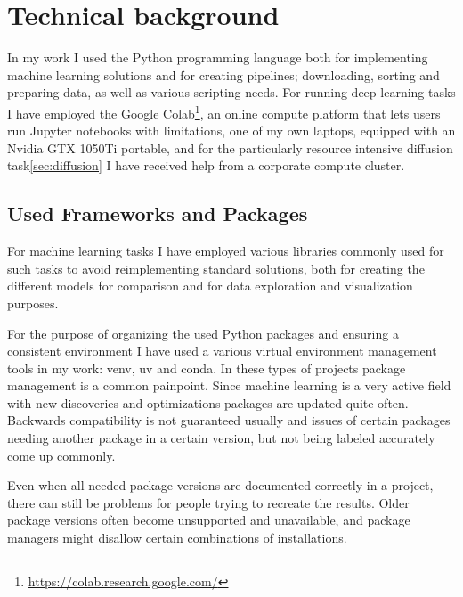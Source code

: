 \chapter{Technical background}

	In my work I used the Python programming language both for implementing machine learning solutions and for creating pipelines; downloading, sorting and preparing data, as well as various scripting needs. For running deep learning tasks I have employed the Google Colab\footnote{\url{https://colab.research.google.com/}}, an online compute platform that lets users run Jupyter notebooks with limitations, one of my own laptops, equipped with an Nvidia GTX 1050Ti portable, and for the particularly resource intensive diffusion task\ref{sec:diffusion} I have received help from a corporate compute cluster.

\section{Used Frameworks and Packages}

	For machine learning tasks I have employed various libraries commonly used for such tasks to avoid reimplementing standard solutions, both for creating the different models for comparison and for data exploration and visualization purposes.
	
	For the purpose of organizing the used Python packages and ensuring a consistent environment I have used a various virtual environment management tools in my work: venv, uv and conda. In these types of projects package management is a common painpoint. Since machine learning is a very active field with new discoveries and optimizations packages are updated quite often. Backwards compatibility is not guaranteed usually and issues of certain packages needing another package in a certain version, but not being labeled accurately come up commonly.
	
	Even when all needed package versions are documented correctly in a project, there can still be problems for people trying to recreate the results. Older package versions often become unsupported and unavailable, and package managers might disallow certain combinations of installations.

